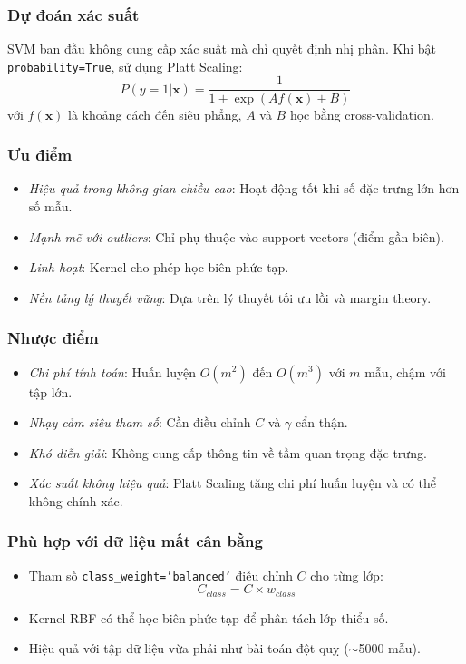 ﻿\documentclass{article}
\begin{document}
\subsubsection*{Dự đoán xác suất}
SVM ban đầu không cung cấp xác suất mà chỉ quyết định nhị phân. Khi bật \texttt{probability=True}, sử dụng Platt Scaling:
\begin{equation}
P(y=1|\mathbf{x}) = \frac{1}{1 + \exp(Af(\mathbf{x}) + B)}
\end{equation}
với $f(\mathbf{x})$ là khoảng cách đến siêu phẳng, $A$ và $B$ học bằng cross-validation.

\subsubsection*{Ưu điểm}
\begin{itemize}
    \item \textit{Hiệu quả trong không gian chiều cao}: Hoạt động tốt khi số đặc trưng lớn hơn số mẫu.
    \item \textit{Mạnh mẽ với outliers}: Chỉ phụ thuộc vào support vectors (điểm gần biên).
    \item \textit{Linh hoạt}: Kernel cho phép học biên phức tạp.
    \item \textit{Nền tảng lý thuyết vững}: Dựa trên lý thuyết tối ưu lồi và margin theory.
\end{itemize}

\subsubsection*{Nhược điểm}
\begin{itemize}
    \item \textit{Chi phí tính toán}: Huấn luyện $O(m^2)$ đến $O(m^3)$ với $m$ mẫu, chậm với tập lớn.
    \item \textit{Nhạy cảm siêu tham số}: Cần điều chỉnh $C$ và $\gamma$ cẩn thận.
    \item \textit{Khó diễn giải}: Không cung cấp thông tin về tầm quan trọng đặc trưng.
    \item \textit{Xác suất không hiệu quả}: Platt Scaling tăng chi phí huấn luyện và có thể không chính xác.
\end{itemize}

\subsubsection*{Phù hợp với dữ liệu mất cân bằng}
\begin{itemize}
    \item Tham số \texttt{class\_weight='balanced'} điều chỉnh $C$ cho từng lớp:
    \begin{equation}
    C_{class} = C \times w_{class}
    \end{equation}
    \item Kernel RBF có thể học biên phức tạp để phân tách lớp thiểu số.
    \item Hiệu quả với tập dữ liệu vừa phải như bài toán đột quỵ ($\sim$5000 mẫu).
\end{itemize}
\end{document}
